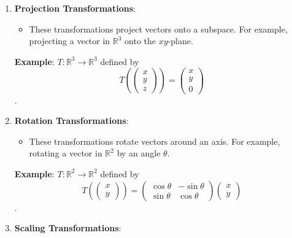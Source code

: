 \documentclass[11pt]{article}
\providecommand{\tightlist}{%
      \setlength{\itemsep}{0pt}\setlength{\parskip}{0pt}}
\begin{document}
\begin{enumerate}
  \begin{itemize}
  \tightlist
  \item
    This transformation maps every vector to the zero vector. It is
    defined by \(T(\vec{x}) = \vec{0}\) for all \(\vec{x}\) in the
    vector space.
  \end{itemize}

  \textbf{Example}: \(T: \mathbb{R}^2 \to \mathbb{R}^2\) defined by
  \[T\left(\begin{pmatrix} x \\ y \end{pmatrix}\right) = \begin{pmatrix} 0 \\ 0 \end{pmatrix}\].
\item
  \textbf{Projection Transformations}:

  \begin{itemize}
  \tightlist
  \item
    These transformations project vectors onto a subspace. For example,
    projecting a vector in \(\mathbb{R}^3\) onto the \(xy\)-plane.
  \end{itemize}

  \textbf{Example}: \(T: \mathbb{R}^3 \to \mathbb{R}^3\) defined by
  \[T\left(\begin{pmatrix} x \\ y \\ z \end{pmatrix}\right) = \begin{pmatrix} x \\ y \\ 0 \end{pmatrix}\].
\item
  \textbf{Rotation Transformations}:

  \begin{itemize}
  \tightlist
  \item
    These transformations rotate vectors around an axis. For example,
    rotating a vector in \(\mathbb{R}^2\) by an angle \(\theta\).
  \end{itemize}

  \textbf{Example}: \(T: \mathbb{R}^2 \to \mathbb{R}^2\) defined by
  \[T\left(\begin{pmatrix} x \\ y \end{pmatrix}\right) = \begin{pmatrix} \cos\theta & -\sin\theta \\ \sin\theta & \cos\theta \end{pmatrix} \begin{pmatrix} x \\ y \end{pmatrix}\].
\item
  \textbf{Scaling Transformations}:


\end{enumerate}
\end{document}
